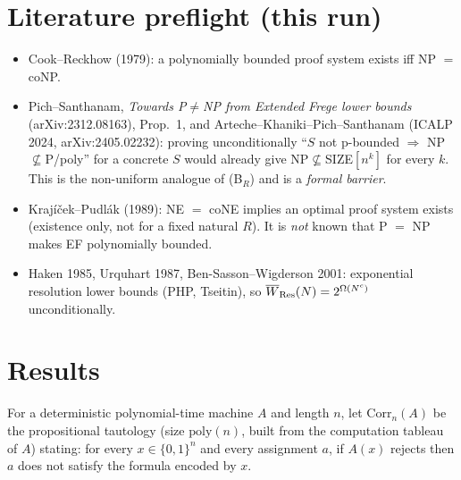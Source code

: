 \documentclass[11pt]{article}
\begin{document}
\section{Literature preflight (this run)}
\begin{itemize}
\item Cook--Reckhow (1979): a polynomially bounded proof system exists iff NP $=$ coNP.
\item Pich--Santhanam, \emph{Towards P$\ne$NP from Extended Frege lower bounds}
(arXiv:2312.08163), Prop.~1, and Arteche--Khaniki--Pich--Santhanam (ICALP 2024,
arXiv:2405.02232): proving unconditionally ``$S$ not p-bounded $\Rightarrow$ NP$\not\subseteq$P/poly''
for a concrete $S$ would already give NP$\not\subseteq$SIZE$[n^k]$ for every $k$. This is
the non-uniform analogue of (B$_R$) and is a \emph{formal barrier}.
\item Krajíček--Pudlák (1989): NE $=$ coNE implies an optimal proof system exists (existence only,
not for a fixed natural $R$). It is \emph{not} known that P $=$ NP makes EF polynomially bounded.
\item Haken 1985, Urquhart 1987, Ben-Sasson--Wigderson 2001: exponential resolution lower
bounds (PHP, Tseitin), so $\overline W_{\rm Res}(N)=2^{\Omega(N^{c})}$ unconditionally.
\end{itemize}

\section{Results}
\begin{definition}
For a deterministic polynomial-time machine $A$ and length $n$, let $\mathrm{Corr}_n(A)$ be
the propositional tautology (size $\mathrm{poly}(n)$, built from the computation tableau of $A$)
stating: for every $x\in\{0,1\}^n$ and every assignment $a$, if $A(x)$ rejects then $a$ does
not satisfy the formula encoded by $x$.
\end{definition}
\end{document}
